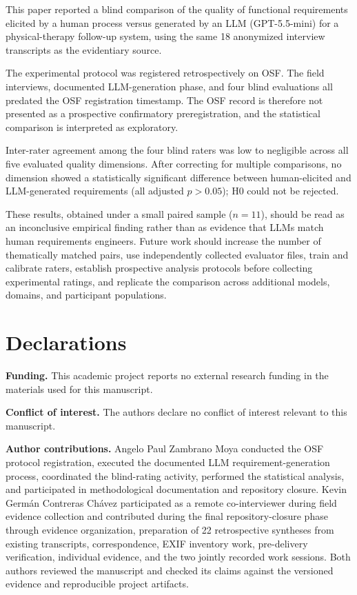 \documentclass[pdflatex,sn-basic]{sn-jnl}
\begin{document}
This paper reported a blind comparison of the quality of functional requirements elicited by a human process versus generated by an LLM (GPT-5.5-mini) for a physical-therapy follow-up system, using the same 18 anonymized interview transcripts as the evidentiary source.

The experimental protocol was registered retrospectively on OSF. The field interviews, documented LLM-generation phase, and four blind evaluations all predated the OSF registration timestamp. The OSF record is therefore not presented as a prospective confirmatory preregistration, and the statistical comparison is interpreted as exploratory.

Inter-rater agreement among the four blind raters was low to negligible across all five evaluated quality dimensions. After correcting for multiple comparisons, no dimension showed a statistically significant difference between human-elicited and LLM-generated requirements (all adjusted $p > 0.05$); H0 could not be rejected.

These results, obtained under a small paired sample ($n=11$), should be read as an inconclusive empirical finding rather than as evidence that LLMs match human requirements engineers. Future work should increase the number of thematically matched pairs, use independently collected evaluator files, train and calibrate raters, establish prospective analysis protocols before collecting experimental ratings, and replicate the comparison across additional models, domains, and participant populations.

\section*{Declarations}

\textbf{Funding.}
This academic project reports no external research funding in the materials used for this manuscript.

\textbf{Conflict of interest.}
The authors declare no conflict of interest relevant to this manuscript.

\textbf{Author contributions.}
Angelo Paul Zambrano Moya conducted the OSF protocol registration, executed the documented LLM requirement-generation process, coordinated the blind-rating activity, performed the statistical analysis, and participated in methodological documentation and repository closure. Kevin Germán Contreras Chávez participated as a remote co-interviewer during field evidence collection and contributed during the final repository-closure phase through evidence organization, preparation of 22 retrospective syntheses from existing transcripts, correspondence, EXIF inventory work, pre-delivery verification, individual evidence, and the two jointly recorded work sessions. Both authors reviewed the manuscript and checked its claims against the versioned evidence and reproducible project artifacts.
\end{document}
